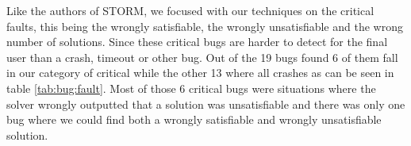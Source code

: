 \label{res:CauseOfBug}
Like the authors of STORM, we focused with our techniques on the critical faults, this being the wrongly satisfiable, the wrongly unsatisfiable and the wrong number of solutions. Since these critical bugs are harder to detect for the final user than a crash, timeout or other bug. Out of the 19 bugs found 6 of them fall in our category of critical while the other 13 where all crashes as can be seen in table \ref{tab:bug:fault}. Most of those 6 critical bugs were situations where the solver wrongly outputted that a solution was unsatisfiable and there was only one bug where we could find both a wrongly satisfiable and wrongly unsatisfiable solution.

